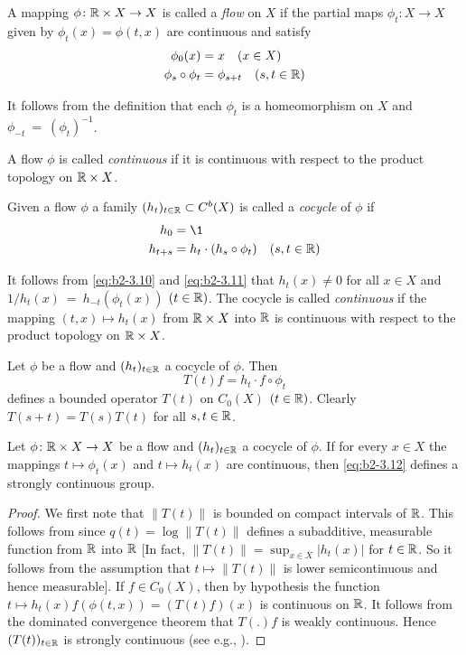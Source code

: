 A mapping $\phi \colon \mathbb{R} \times X \to X$ is called a \emph{flow} on $X$ if the partial maps $\phi_{t} \colon X \to X$ given by $\phi_{t}(x) = \phi(t,x)$ are continuous and satisfy
\begin{align}
\phi_{0}(x) &= x \quad (x \in X) \label{eq:b2-3.8} \\
\phi_{s} \circ \phi_{t} &= \phi_{s+t} \quad (s,t \in \mathbb{R}) \label{eq:b2-3.9}
\end{align}

It follows from the definition that each $\phi_{t}$ is a homeomorphism on $X$ and  \\
$\phi_{-t}~=~(\phi_{t})^{-1}$.

A flow $\phi$ is called \emph{continuous} if it is continuous with respect to the product topology on $\mathbb{R} \times X$.

Given a flow $\phi$ a family $(h_{t})_{t \in \mathbb{R}} \subset C^{b}(X)$ is called a \emph{cocycle} of $\phi$ if
\begin{align}
h_{0} &= \1 \label{eq:b2-3.10} \\
h_{t+s} &= h_{t} \cdot (h_{s} \circ \phi_{t}) \quad (s,t \in \R) \label{eq:b2-3.11}
\end{align}

It follows from \eqref{eq:b2-3.10} and \eqref{eq:b2-3.11} that $h_{t}(x) \neq 0$ for all $x \in X$ and 
$1/h_{t}(x)~=~h_{-t}(\phi_{t}(x))$ $(t \in \mathbb{R})$.
The cocycle is called \emph{continuous} if the mapping $(t,x) \mapsto h_{t}(x)$ from $\mathbb{R} \times X$ into $\mathbb{R}$ is continuous with respect to the product topology on $\mathbb{R} \times X$.

Let $\phi$ be a flow and $(h_{t})_{t \in \mathbb{R}}$ a cocycle of $\phi$.
Then
\begin{equation}\label{eq:b2-3.12}
T(t)f = h_{t} \cdot f \circ \phi_{t}
\end{equation}
defines a bounded operator $T(t)$ on $C_{0}(X)$ $(t \in \mathbb{R})$.
Clearly $T(s+t) = T(s)T(t)$ for all $s,t \in \mathbb{R}$.

\begin{proposition}\label{prop:b2-3.8}
Let $\phi \colon \mathbb{R} \times X \to X$ be a flow and $(h_{t})_{t \in \mathbb{R}}$ a cocycle of $\phi$.
If for every $x \in X$ the mappings $t \mapsto \phi_{t}(x)$ and $t \mapsto h_{t}(x)$ are continuous, then \eqref{eq:b2-3.12} defines a strongly continuous group.
\end{proposition}
\begin{proof}
We first note that $\|T(t)\|$ is bounded on compact intervals of $\mathbb{R}$.
This follows from \citet[7.4.1]{hillephillips:1957} since $q(t) = \log\|T(t)\|$ defines a subadditive, measurable function from $\mathbb{R}$ into $\mathbb{R}$ [In fact, $\|T(t)\| = \sup_{x \in X}|h_{t}(x)|$ for $t \in \mathbb{R}$.
So it follows from the assumption that $t \mapsto \|T(t)\|$ is lower semicontinuous and hence measurable].
If $f \in C_{0}(X)$, then by hypothesis the function
$t \mapsto h_{t}(x) f(\phi(t,x)) = (T(t) f) (x)$ is continuous on $\mathbb{R}$.
It follows from the dominated convergence theorem that $T(.)f$ is weakly continuous.
Hence $(T(t))_{t \in \mathbb{R}}$ is strongly continuous (see e.g., \citet[Proposition  1.23]{davies:1980}).
\end{proof}

